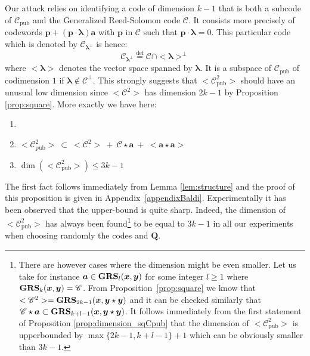 \documentclass[runningheads,11pt]{llncs}
\newcommand{\eqdef}{\stackrel{\text{def}}{=}}
\newcommand{\code}[1]{\ensuremath{\mathscr{#1}}}
\newcommand{\Cpub}{\code{C}_{\text{pub}}}
\newcommand{\CC}{\code{C}}
\newcommand{\sqc}[1]{<#1^2>}
\newcommand{\scp}[2]{#1\cdot #2}
\newcommand{\cwp}{\star}
\newcommand{\word}[1]{\ensuremath{\boldsymbol{#1}}}
\newcommand{\av}{\word{a}}
\newcommand{\lambdav}{\word{\lambda}}
\newcommand{\pv}{\word{p}}
\newcommand{\xv}{\word{x}}
\newcommand{\yv}{\word{y}}
\newcommand{\mat}[1]{\ensuremath{\boldsymbol{#1}}}
\newcommand{\Qm}{\mat{Q}}
\newcommand{\GRS}[3]{\text{\bf GRS}_{#1}(#2,#3)}
\begin{document}
\medskip

Our attack relies on identifying a code of dimension $k - 1$
that is both a subcode of  $\Cpub$ and the
Generalized Reed-Solomon code $\CC$. It consists more precisely of
codewords $\pv + (\scp{\pv}{\lambdav}) \av$ with $\pv$ in $\CC$ such that  
$\scp{\pv}{\lambdav} = 0$. This particular code which is denoted by
$\CC_{\lambdav^\perp}$ is hence:
$$
\CC_{\lambdav^\perp} \eqdef \CC \cap <\lambdav>^\perp
$$ 
where $<\lambdav>$ denotes the vector space spanned by $\lambdav$. 
It is a subspace of $\Cpub$ of codimension $1$ if $\lambdav \notin \CC^\perp$.
This strongly suggests that $\sqc{\Cpub}$ should have an unusual
low dimension since  $\sqc{\CC}$ has dimension  $2k-1$ by
Proposition \ref{prop:square}. 
More  exactly we have here:


\begin{proposition}
\label{prop:dimension_sqCpub}
\begin{enumerate}
\item[]
\item $\displaystyle \sqc{\Cpub}  ~\subset~  \sqc{\CC} ~+~ \CC \cwp \av ~+~ <\av\cwp\av>$
\item $\dim\left( \sqc{\Cpub} \right) \leqslant  3k-1$
\end{enumerate}
\end{proposition}

\medskip

The first fact follows immediately from Lemma \ref{lem:structure} and the proof
of this proposition is given in Appendix~\ref{appendixBaldi}. Experimentally it has been observed that the upper-bound 
is quite sharp. Indeed, the dimension of $\sqc{\Cpub}$ has always been
found\footnote{There are however cases where the dimension might be
  even smaller. Let us take for instance
$\av \in \GRS{l}{\xv}{\yv}$ for some integer $l \geqslant 1$ 
where $\GRS{k}{\xv}{\yv}=\CC$. From Proposition~\ref{prop:square} we know that
$ \sqc{\CC}= \GRS{2k-1}{\xv}{\yv \cwp \yv}$ and it can be checked similarly that 
$ \CC \cwp \av \subset \GRS{k+l-1}{\xv}{\yv \cwp \yv}$. It follows immediately from the first statement of
Proposition \ref{prop:dimension_sqCpub} that the dimension of 
$\sqc{\Cpub}$ is upperbounded by $\max\{2k-1,k+l-1\}+1$ which can be obviously smaller than
$3k-1$.} to be equal to $3k-1$ in all our experiments when choosing randomly the
codes and $\Qm$. 

\medskip
\end{document}
